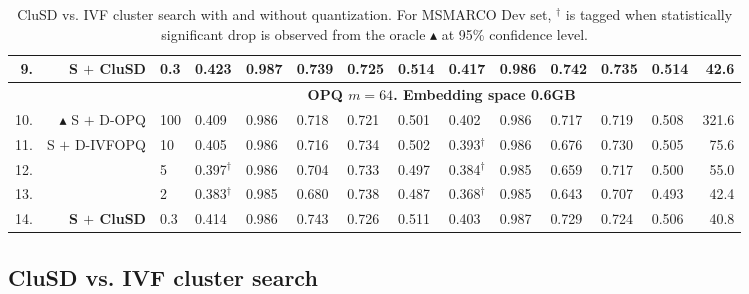 \begin{table*}[htbp]
{\begin{tabular}{ r r l |l l ll l |llll l|r}
           9. &   \textbf{S $+$ CluSD}  &0.3& 0.423 & 0.987 & 0.739& 0.725 &0.514 & 0.417& 0.986& 0.742&0.735& 0.514  & 42.6  \\
             \hline
           & & & \multicolumn{10}{c}{\bf{OPQ $m=64$. Embedding space 0.6GB}}\\
            \hline
           10. & $\blacktriangle$  S $+$ D-OPQ  &100 & 0.409 & 0.986 & 0.718 &  0.721  &0.501 & 0.402 & 0.986 & 0.717 &  0.719 & 0.508 & 321.6 \\
           11. &   S $+$ D-IVFOPQ &10& 0.405 & 0.986 & 0.716 & 0.734 & 0.502 & 0.393$^\dag$& 0.986& 0.676&0.730& 0.505& 75.6 \\
           12. &   &5& 0.397$^\dag$& 0.986 & 0.704 & 0.733  & 0.497 & 0.384$^\dag$& 0.985& 0.659&0.717& 0.500& 55.0 \\ 
            13. &  &2& 0.383$^\dag$& 0.985 & 0.680 & 0.738 & 0.487 & 0.368$^\dag$& 0.985 & 0.643&0.707& 0.493 & 42.4 \\
            14. &  \textbf{S $+$ CluSD}  &0.3& 0.414 & 0.986 & 0.743& 0.726 & 0.511 & 0.403 & 0.987& 0.729&0.724 & 0.506 & 40.8 \\
              \hline\hline
		\end{tabular}
		}
	\caption{
CluSD vs. IVF cluster search with and without quantization.
For MSMARCO Dev set, $^\dag$ is tagged when statistically significant drop is observed from the oracle $\blacktriangle$ at 95\% confidence level. 
}
\vspace*{-5mm}
	\label{tab:mainspace}
\end{table*}

\subsection{CluSD vs. IVF  cluster search}
\label{sect:eval0space}


